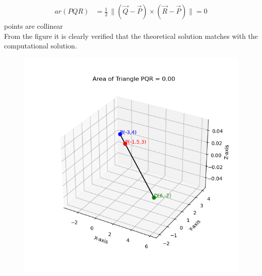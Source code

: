 \documentclass[journal]{IEEEtran}
\begin{document}
\begin{align}
ar(PQR) &= \frac{1}{2} \, \|(\vec{Q} - \vec{P}) \times (\vec{R} - \vec{P}) \|=0
\end{align}
points are collinear\\
From the figure it is clearly verified that the theoretical solution matches with the computational solution.\\
\begin{figure}[h!]
    \centering
    \includegraphics[height=0.5\textheight, keepaspectratio]{figs/fig4.png}
    \label{figure_1}
\end{figure}
 
\end{document}
